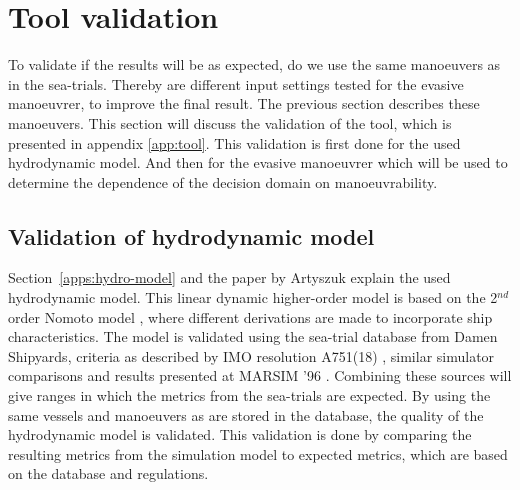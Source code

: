 \section{Tool validation}
\label{sec:manoeuvrer-results}
To validate if the results will be as expected, do we use the same manoeuvers as in the sea-trials. Thereby are different input settings tested for the evasive manoeuvrer, to improve the final result. The previous section describes these manoeuvers. This section will discuss the validation of the tool, which is presented in appendix \ref{app:tool}. This validation is first done for the used hydrodynamic model. And then for the evasive manoeuvrer which will be used to determine the dependence of the decision domain on manoeuvrability. 

\subsection{Validation of hydrodynamic model}
Section~\ref{apps:hydro-model} and the paper by Artyszuk \cite{Artyszuk2016} explain the used hydrodynamic model. This linear dynamic higher-order model is based on the 2$^{nd}$ order Nomoto model \cite{Nomoto1957}, where different derivations are made to incorporate ship characteristics. 
The model is validated using the sea-trial database from Damen Shipyards, criteria as described by IMO resolution A751(18) \cite{Quadvlieg2003}, similar simulator comparisons \cite{Tjoswold2012} and results presented at MARSIM '96 \cite{MARSIM1996}. Combining these sources will give ranges in which the metrics from the sea-trials are expected. By using the same vessels and manoeuvers as are stored in the database, the quality of the hydrodynamic model is validated. This validation is done by comparing the resulting metrics from the simulation model to expected metrics, which are based on the database and regulations. 

